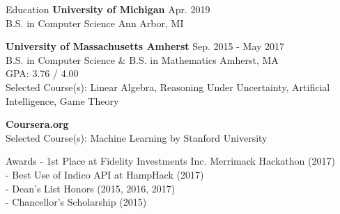 \documentclass{resume} %
\begin{document}
	
	

	\begin{rSection}{Education}
		{\bf University of Michigan} \hfill {Apr. 2019} \\ 
		B.S. in Computer Science \hfill {Ann Arbor, MI}
		
		{\bf University of Massachusetts Amherst} \hfill {Sep. 2015 - May 2017} \\ 
		B.S. in Computer Science \& B.S. in Mathematics \hfill {Amherst, MA} \\
		GPA: 3.76 / 4.00 \smallskip \\
		Selected Course(s): Linear Algebra, Reasoning Under Uncertainty, Artificial Intelligence, Game Theory
		
		\textbf{Coursera.org} \\
		Selected Course(s): Machine Learning by Stanford University
	\end{rSection}
	
	
	\begin{rSection}{Awards}
		- 1st Place at Fidelity Investments Inc. Merrimack Hackathon (2017) \\
		- Best Use of Indico API at HampHack (2017) \\
		- Dean's List Honors (2015, 2016, 2017) \\
		- Chancellor's Scholarship (2015)
	\end{rSection}
	
	
\end{document}
